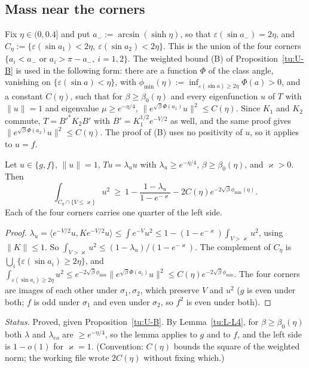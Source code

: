 \subsection{Mass near the corners}

Fix $\eta\in(0,0.4]$ and put $a_-:=\arcsin(\sinh\eta)$, so that $\varepsilon(\sin a_-)=2\eta$, and
$C_\eta:=\{\varepsilon(\sin a_1)<2\eta,\ \varepsilon(\sin a_2)<2\eta\}$. This is the union of the four
corners $\{a_i<a_-\text{ or }a_i>\pi-a_-,\ i=1,2\}$. The weighted bound (B) of
Proposition~\ref{tu:U-B} is used in the following form: there are a function $\Phi$ of the class angle,
vanishing on $\{\varepsilon(\sin a)<\eta\}$, with $\phi_{\min}(\eta):=\inf_{\varepsilon(\sin a)\ge2\eta}\Phi(a)>0$,
and a constant $C(\eta)$, such that for $\beta\ge\beta_0(\eta)$ and every eigenfunction $u$ of $T$
with $\|u\|=1$ and eigenvalue $\mu\ge e^{-\eta/4}$, $\|e^{\sqrt\beta\Phi(a_1)}u\|^2\le C(\eta)$. Since
$K_1$ and $K_2$ commute, $T=B'^*K_2B'$ with $B'=K_1^{1/2}e^{-V/2}$ as well, and the same proof gives
$\|e^{\sqrt\beta\Phi(a_2)}u\|^2\le C(\eta)$. The proof of (B) uses no positivity of $u$, so it applies to
$u=f$.

\begin{lemma}[M4]\label{tu:L-M4}
Let $u\in\{g,f\}$, $\|u\|=1$, $Tu=\lambda_uu$ with $\lambda_u\ge e^{-\eta/4}$, $\beta\ge\beta_0(\eta)$,
and $\varkappa>0$. Then
\[
\int_{C_\eta\cap\{V\le\varkappa\}}u^2\ \ge\ 1-\frac{1-\lambda_u}{1-e^{-\varkappa}}-2C(\eta)e^{-2\sqrt\beta\phi_{\min}(\eta)} .
\]
Each of the four corners carries one quarter of the left side.
\end{lemma}

\begin{proof}
$\lambda_u=\langle e^{-V/2}u,Ke^{-V/2}u\rangle\le\int e^{-V}u^2\le1-(1-e^{-\varkappa})\int_{V>\varkappa}u^2$,
using $\|K\|\le1$. So $\int_{V>\varkappa}u^2\le(1-\lambda_u)/(1-e^{-\varkappa})$. The complement of
$C_\eta$ is $\bigcup_i\{\varepsilon(\sin a_i)\ge2\eta\}$, and
$\int_{\varepsilon(\sin a_i)\ge2\eta}u^2\le e^{-2\sqrt\beta\phi_{\min}}\|e^{\sqrt\beta\Phi(a_i)}u\|^2\le C(\eta)e^{-2\sqrt\beta\phi_{\min}}$.
The four corners are images of each other under $\sigma_1,\sigma_2$, which preserve $V$ and $u^2$
($g$ is even under both; $f$ is odd under $\sigma_1$ and even under $\sigma_2$, so $f^2$ is even under both).
\end{proof}

\noindent\emph{Status.} Proved, given Proposition~\ref{tu:U-B}. By Lemma~\ref{tu:L-L4}, for
$\beta\ge\beta_0(\eta)$ both $\lambda$ and $\lambda_{eo}$ are $\ge e^{-\eta/4}$, so the lemma applies
to $g$ and to $f$, and the left side is $1-o(1)$ for $\varkappa=1$. (Convention: $C(\eta)$ bounds the
square of the weighted norm; the working file wrote $2C(\eta)$ without fixing which.)

